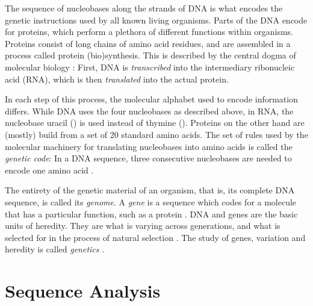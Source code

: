 
The sequence of nucleobases along the strands of DNA is what encodes the genetic instructions
used by all known living organisms.
Parts of the DNA encode for proteins,
which perform a plethora of different functions within organisms.
Proteins consist of long chains of amino acid residues, and
are assembled in a process called protein (bio)synthesis.
This is described by the central dogma of molecular biology \cite{Crick1958,Crick1970}:
First, DNA is \emph{transcribed} into the intermediary ribonucleic acid (RNA),
which is then \emph{translated} into the actual protein.

In each step of this process, the molecular alphabet used to encode information differs.
While DNA uses the four nucleobases as described above,
in RNA, the nucleobase uracil () is used instead of thymine ().
Proteins on the other hand are (mostly) build from a set of \num{20} standard amino acids.
The set of rules used by the molecular machinery for translating nucleobases into amino acids
is called the \emph{genetic code}:
In a DNA sequence, three consecutive nucleobases are needed to encode one amino acid \cite{Shu2017}.

The entirety of the genetic material of an organism, that is, its complete DNA sequence, is called its \emph{genome}.
A \emph{gene} is a sequence which codes for a molecule that has a particular function, such as a protein \cite{Gericke2007}.
DNA and genes are the basic units of heredity.
They are what is varying across generations,
and what is selected for in the process of natural selection \cite{Dawkins1989}.
The study of genes, variation and heredity is called \emph{genetics} \cite{Griffiths2000}.


\section{Sequence Analysis}
\label{ch:Foundations:sec:SequenceAnalysis}

